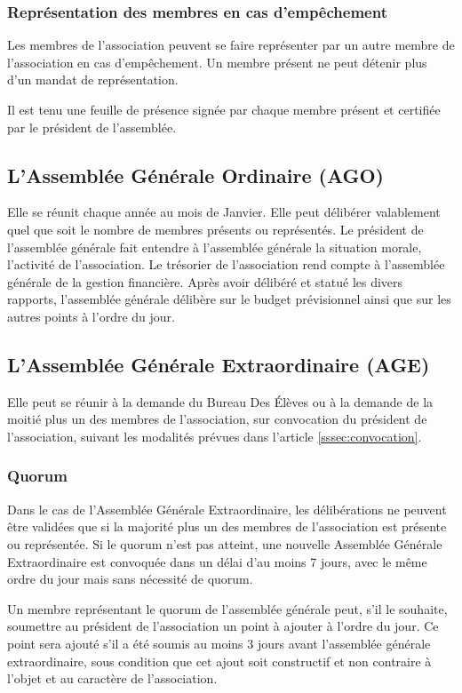 \documentclass{article} %
\begin{document}
			\subsubsection{Représentation des membres en cas d’empêchement}
				Les membres de l’association peuvent se faire représenter par un
				autre membre de l’association en cas d’empêchement. Un membre présent
				ne peut détenir plus d’un mandat de représentation.

				Il est tenu une feuille de présence signée par chaque membre présent
				et certifiée par le président de l’assemblée.

		\subsection{L’Assemblée Générale Ordinaire (AGO)}
			Elle se réunit chaque année au mois de Janvier. Elle peut délibérer
			valablement quel que soit le nombre de membres présents ou représentés.
			Le président de l’assemblée générale fait entendre à l’assemblée générale
			la situation morale, l’activité de l’association. Le trésorier de
			l’association rend compte à l’assemblée générale de la gestion
			financière. Après avoir délibéré et statué les divers rapports,
			l’assemblée générale délibère sur le budget prévisionnel ainsi que sur
			les autres points à l’ordre du jour. 

		\subsection{L’Assemblée Générale Extraordinaire (AGE)}
			Elle peut se réunir à la demande du Bureau Des Élèves ou à la demande de
			la moitié plus un des membres de l’association, sur convocation du
			président de l’association, suivant les modalités prévues dans l’article
			\ref{sssec:convocation}.

			\subsubsection{Quorum}
				Dans le cas de l’Assemblée Générale Extraordinaire, les délibérations
				ne peuvent être validées que si la majorité plus un
				des membres de l’association est présente ou représentée. Si le
				quorum n’est pas atteint, une nouvelle Assemblée Générale
				Extraordinaire
				est convoquée dans un délai d’au moins 7 jours, avec le même ordre du
				jour mais sans nécessité de quorum.

				Un membre représentant le quorum de l’assemblée générale peut, s’il
				le souhaite, soumettre au président de l’association un point à
				ajouter
				à l’ordre du jour. Ce point sera ajouté s’il a été soumis au moins 3
				jours avant l’assemblée générale extraordinaire, sous condition que
				cet
				ajout soit constructif et non contraire à l'objet et au caractère de
				l’association.
\end{document}

